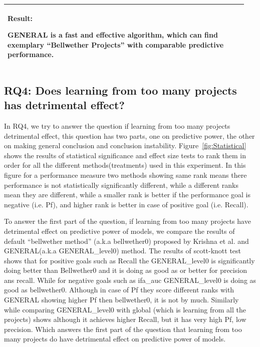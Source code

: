 \documentclass[10pt,journal,compsoc]{IEEEtran}
\newenvironment{result}
{\vspace{0.15cm}
\noindent\begin{minipage}{\linewidth}
\begin{center}
\arrayrulecolor{lightergray}
\begin{tabular}{|p{0.95\linewidth}|}
\hline%
\rowcolor{lightergray}%
\textbf{Result:}~%
}
{\\\hline
\end{tabular}
\end{center}
\end{minipage}
\vspace{0.15cm}
}
\begin{document}
\begin{result}
{GENERAL is a fast and effective algorithm, which can find exemplary ``Bellwether Projects'' with comparable predictive performance.}
\end{result}




\subsection*{RQ4: Does learning from too many projects has detrimental effect?}
\label{sec:rq4}
In RQ4, we try to answer the question if learning from too many projects detrimental effect, this question has two parts, one on predictive power, the other on making general conclusion and conclusion instability. Figure~\ref{fig:Statistical} shows the results of statistical significance and effect size tests to rank them in order for all the different methods(treatments) used in this experiment. In this figure for a performance measure two methods showing same rank means there performance is not statistically significantly different, while a different ranks mean they are different, while a smaller rank is better if the performance goal is negative (i.e. Pf), and higher rank is better in case of positive goal (i.e. Recall).

To answer the first part of the question, if learning from too many projects have detrimental effect on predictive power of models, we compare the results of default ``bellwether method'' (a.k.a bellwether0) proposed by Krishna et al. and GENERAL(a.k.a GENERAL\_level0) method. The results of scott-knott test shows that for positive goals such as Recall the GENERAL\_level0 is significantly doing better than Bellwether0 and it is doing as good as or better for precision ans recall. While for negative goals such as ifa\_auc GENERAL\_level0 is doing as good as bellwether0. Although in case of Pf they score different ranks with GENERAL showing higher Pf then bellwether0, it is not by much. Similarly while comparing GENERAL\_level0 with global (which is learning from all the projects) shows although it achieves higher Recall, but it has very high Pf, low precision. Which answers the first part of the question that learning from too many projects do have detrimental effect on predictive power of models. 
\end{document}
